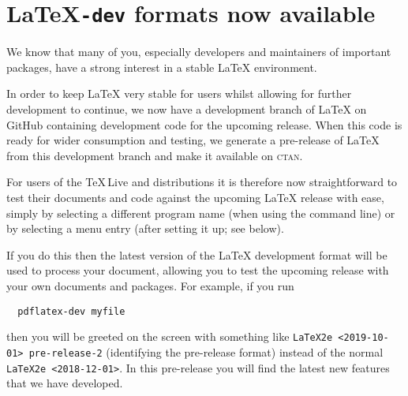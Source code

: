 \documentclass{ltnews}
\providecommand\MiKTeX{\hologo{MiKTeX}}
\providecommand\CTAN{\textsc{ctan}}
\providecommand\TL{\TeX\,Live}
\begin{document}

\maketitle
\tableofcontents

\setlength{}


\medskip





\section{\LaTeX\texttt{-dev} formats now available}


We know that many of you, especially developers and maintainers of
important packages, have a strong interest in a stable \LaTeX{}
environment.

In order to keep \LaTeX{} very stable for users whilst allowing for
further development to continue, we now have a development branch of
\LaTeX{} on GitHub containing development code for the upcoming
release. When this code is ready for wider consumption and testing, we
generate a pre-release of \LaTeX{} from this development branch and make
it available on \CTAN.

For users of the \TL{} and \MiKTeX{} distributions it is therefore now
straightforward to test their documents and code against the upcoming
\LaTeX{} release with ease, simply by selecting a different program name
(when using the command line) or by selecting a menu entry (after
setting it up; see below).

If you do this then the latest version of the \LaTeX{} development format
will be used to process your document, allowing you to test the
upcoming release with your own documents and packages. For example, if
you run
\begin{verbatim}
  pdflatex-dev myfile
\end{verbatim}
then you will be greeted on the screen with something like \texttt{LaTeX2e
  <2019-10-01> pre-release-2} (identifying the pre-release format)
instead of the normal \texttt{LaTeX2e <2018-12-01>}. In this
pre-release you will find the latest new features that we have
developed.
\end{document}
